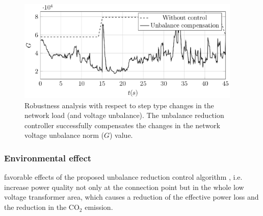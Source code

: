              \begin{figure}[ht]
            \centering
            \includegraphics[width=0.95\textwidth]{Unblance_EPS_Pics/UnbalRedComp_JCP-figure5.eps}
            \caption{Robustness analysis with respect to step type changes in the network load (and voltage unbalance). The unbalance reduction controller successfully compensates the changes in the network voltage unbalance norm ($G$) value.}
            \label{fig:robustness}
            \end{figure}



    \subsubsection{Environmental effect}
            favorable effects of the proposed unbalance reduction control algorithm , i.e. increase power quality not only at the connection point but in the whole low voltage transformer area, which causes a reduction of the effective power loss and the reduction in the CO${}_2$ emission.

